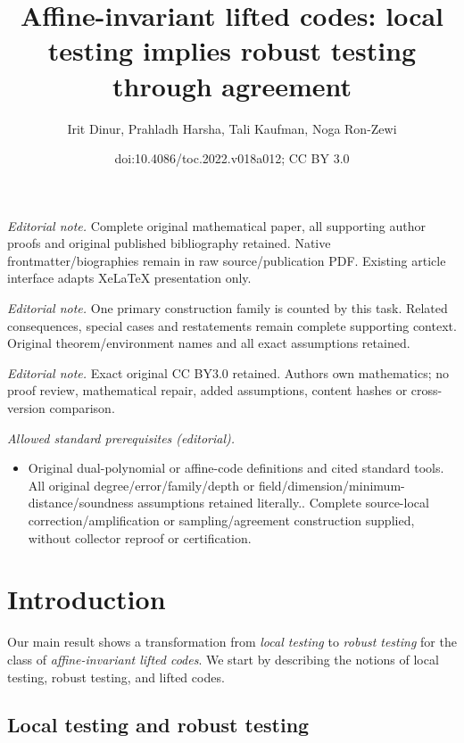 \documentclass[11pt]{article}
\title{Affine-invariant lifted codes: local testing implies robust testing through agreement}
\author{Irit Dinur, Prahladh Harsha, Tali Kaufman, Noga Ron-Zewi}
\date{doi:10.4086/toc.2022.v018a012; CC BY 3.0}
\numberwithin{equation}{section}
\theoremstyle{definition}
\theoremstyle{plain}
\theoremstyle{plain}
\begin{document}
\maketitle
\noindent\textit{Editorial note.} Complete original mathematical paper, all supporting author proofs and original published bibliography retained. Native frontmatter/biographies remain in raw source/publication PDF. Existing article interface adapts XeLaTeX presentation only.\par\medskip
\noindent\textit{Editorial note.} One primary construction family is counted by this task. Related consequences, special cases and restatements remain complete supporting context. Original theorem/environment names and all exact assumptions retained.\par\medskip
\noindent\textit{Editorial note.} Exact original CC BY3.0 retained. Authors own mathematics; no proof review, mathematical repair, added assumptions, content hashes or cross-version comparison.\par\medskip
\noindent\textit{Allowed standard prerequisites (editorial).}\begin{itemize}
\item Original dual-polynomial or affine-code definitions and cited standard tools. All original degree/error/family/depth or field/dimension/minimum-distance/soundness assumptions retained literally.. Complete source-local correction/amplification or sampling/agreement construction supplied, without collector reproof or certification.
\end{itemize}\medskip
\section{Introduction}

Our main result shows a transformation from \emph{local testing} to \emph{robust testing} for the class of \emph{affine-invariant lifted codes}. We start by describing the notions of local testing, robust testing, and lifted codes.

\subsection{Local testing and robust testing}
\end{document}
